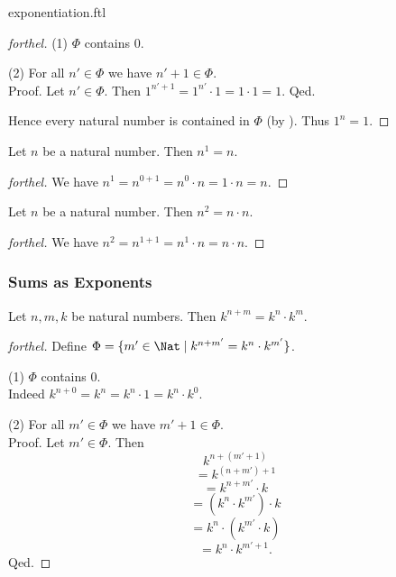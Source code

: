\documentclass{naproche-library}
\begin{document}
\begin{smodule}{exponentiation.ftl}
\begin{proof}[forthel]
    (1) $\Phi$ contains $0$.

    (2) For all $n' \in \Phi$ we have $n' + 1 \in \Phi$. \\
    Proof.
      Let $n' \in \Phi$.
      Then $1^{n' + 1}
        = 1^{n'} \cdot 1
        = 1 \cdot 1
        = 1$.
    Qed.

    Hence every natural number is contained in $\Phi$ (by ).
    Thus $1^{n} = 1$.
  \end{proof}

  \begin{proposition}[forthel,id=ARITHMETIC_09_4975279749464064]
    Let $n$ be a natural number.
    Then $n^{1} = n$.
  \end{proposition}
  \begin{proof}[forthel]
    We have $n^{1}
      = n^{0 + 1}
      = n^{0} \cdot n
      = 1 \cdot n
      = n$.
  \end{proof}

  \begin{proposition}[forthel,id=ARITHMETIC_09_8513812055457792]
    Let $n$ be a natural number.
    Then $n^{2} = n \cdot n$.
  \end{proposition}
  \begin{proof}[forthel]
    We have $n^{2}
      = n^{1 + 1}
      = n^{1} \cdot n
      = n \cdot n$.
  \end{proof}


  \subsubsection*{Sums as Exponents}

  \begin{proposition}[forthel,id=ARITHMETIC_09_8152207530655744]
    Let $n, m, k$ be natural numbers.
    Then $k^{n + m} = k^{n} \cdot k^{m}$.
  \end{proposition}
  \begin{proof}[forthel]
    Define $\Phi = \{ m' \in \Nat \mid k^{n + m'} = k^{n} \cdot k^{m'} \}$.

    (1) $\Phi$ contains $0$. \\
    Indeed $k^{n + 0}
      = k^{n}
      = k^{n} \cdot 1
      = k^{n} \cdot k^{0}$.

    (2) For all $m' \in \Phi$ we have $m' + 1 \in \Phi$. \\
    Proof.
      Let $m' \in \Phi$.
      Then
      \[  k^{n + (m' + 1)}                  \]
      \[    = k^{(n + m') + 1}              \]
      \[    = k^{n + m'} \cdot k            \]
      \[    = (k^{n} \cdot k^{m'}) \cdot k  \]
      \[    = k^{n} \cdot (k^{m'} \cdot k)  \]
      \[    = k^{n} \cdot k^{m' + 1}.       \]
    Qed.


\end{proof}
\end{smodule}
\end{document}

